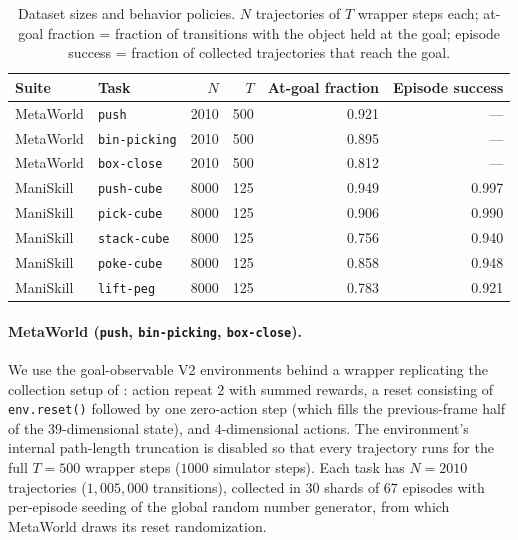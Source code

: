\begin{table}[ht]
\centering
\caption{Dataset sizes and behavior policies. $N$ trajectories of $T$ wrapper steps each; at-goal fraction = fraction of transitions with the object held at the goal; episode success = fraction of collected trajectories that reach the goal.}
\label{tab:app-data-mw-ms}
\small
\begin{tabular}{llrrrr}
\toprule
Suite & Task & $N$ & $T$ & At-goal fraction & Episode success \\
\midrule
MetaWorld & \texttt{push}        & 2010 & 500 & 0.921 & --- \\
MetaWorld & \texttt{bin-picking} & 2010 & 500 & 0.895 & --- \\
MetaWorld & \texttt{box-close}   & 2010 & 500 & 0.812 & --- \\
\midrule
ManiSkill & \texttt{push-cube}   & 8000 & 125 & 0.949 & 0.997 \\
ManiSkill & \texttt{pick-cube}   & 8000 & 125 & 0.906 & 0.990 \\
ManiSkill & \texttt{stack-cube}  & 8000 & 125 & 0.756 & 0.940 \\
ManiSkill & \texttt{poke-cube}   & 8000 & 125 & 0.858 & 0.948 \\
ManiSkill & \texttt{lift-peg}    & 8000 & 125 & 0.783 & 0.921 \\
\bottomrule
\end{tabular}
\end{table}

\paragraph{MetaWorld (\texttt{push}, \texttt{bin-picking}, \texttt{box-close}).}
We use the goal-observable V2 environments behind a wrapper replicating the collection setup of \citet{hansen-iclr26a}: action repeat $2$ with summed rewards, a reset consisting of \texttt{env.reset()} followed by one zero-action step (which fills the previous-frame half of the $39$-dimensional state), and $4$-dimensional actions.
The environment's internal path-length truncation is disabled so that every trajectory runs for the full $T = 500$ wrapper steps ($1000$ simulator steps).
Each task has $N = 2010$ trajectories ($1{,}005{,}000$ transitions), collected in $30$ shards of $67$ episodes with per-episode seeding of the global random number generator, from which MetaWorld draws its reset randomization.

